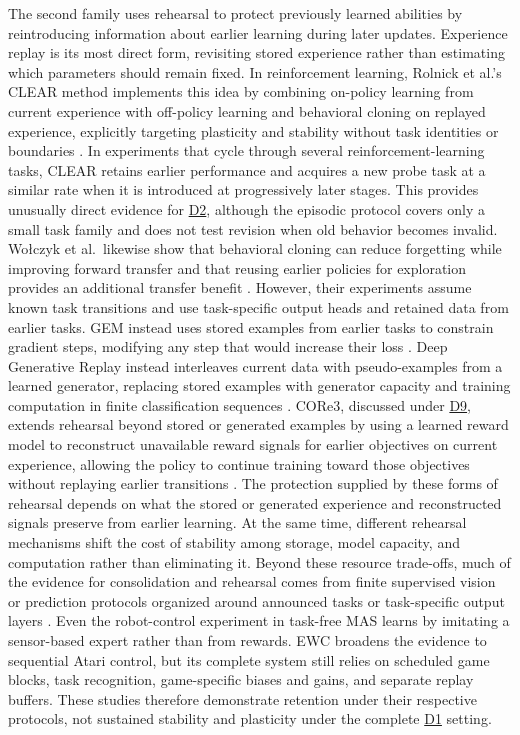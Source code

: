 \documentclass[10pt,journal,compsoc]{IEEEtran}
\DeclareRobustCommand{\Dref}[1]{\hyperref[sec:d#1]{D#1}}
\begin{document}
The second family uses rehearsal to protect previously learned abilities by reintroducing information about earlier learning during later updates.
Experience replay is its most direct form, revisiting stored experience rather than estimating which parameters should remain fixed.
In reinforcement learning, Rolnick et al.'s CLEAR method implements this idea by combining on-policy learning from current experience with off-policy learning and behavioral cloning on replayed experience, explicitly targeting plasticity and stability without task identities or boundaries \cite{rolnick2019}.
In experiments that cycle through several reinforcement-learning tasks, CLEAR retains earlier performance and acquires a new probe task at a similar rate when it is introduced at progressively later stages.
This provides unusually direct evidence for \Dref{2}, although the episodic protocol covers only a small task family and does not test revision when old behavior becomes invalid.
Wo{\l}czyk et al.\ likewise show that behavioral cloning can reduce forgetting while improving forward transfer and that reusing earlier policies for exploration provides an additional transfer benefit \cite{wolczyk2022}.
However, their experiments assume known task transitions and use task-specific output heads and retained data from earlier tasks.
GEM instead uses stored examples from earlier tasks to constrain gradient steps, modifying any step that would increase their loss \cite{lopezpaz2017}.
Deep Generative Replay instead interleaves current data with pseudo-examples from a learned generator, replacing stored examples with generator capacity and training computation in finite classification sequences \cite{shin2017}.
CORe3, discussed under \Dref{9}, extends rehearsal beyond stored or generated examples by using a learned reward model to reconstruct unavailable reward signals for earlier objectives on current experience, allowing the policy to continue training toward those objectives without replaying earlier transitions \cite{li2024a}.
The protection supplied by these forms of rehearsal depends on what the stored or generated experience and reconstructed signals preserve from earlier learning.
At the same time, different rehearsal mechanisms shift the cost of stability among storage, model capacity, and computation rather than eliminating it.
Beyond these resource trade-offs, much of the evidence for consolidation and rehearsal comes from finite supervised vision or prediction protocols organized around announced tasks or task-specific output layers \cite{parisi2019,aljundi2019}.
Even the robot-control experiment in task-free MAS learns by imitating a sensor-based expert rather than from rewards.
EWC broadens the evidence to sequential Atari control, but its complete system still relies on scheduled game blocks, task recognition, game-specific biases and gains, and separate replay buffers.
These studies therefore demonstrate retention under their respective protocols, not sustained stability and plasticity under the complete \Dref{1} setting.
\end{document}
